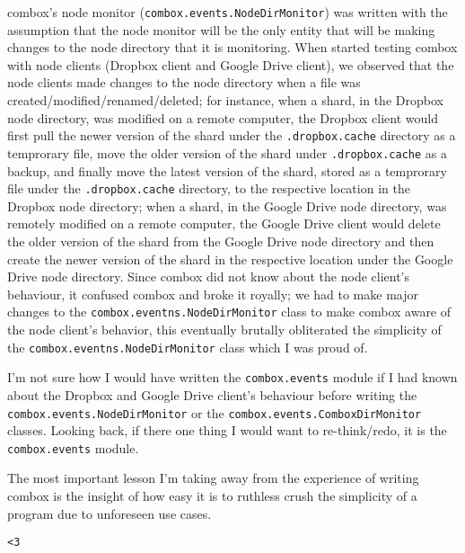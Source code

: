 combox's node monitor (\verb+combox.events.NodeDirMonitor+) was
written with the assumption that the node monitor will be the only
entity that will be making changes to the node directory that it is
monitoring. When started testing combox with node clients (Dropbox
client and Google Drive client), we observed that the node clients
made changes to the node directory when a file was
created/modified/renamed/deleted; for instance, when a shard, in the
Dropbox node directory, was modified on a remote computer, the Dropbox
client would first pull the newer version of the shard under the
\verb+.dropbox.cache+ directory as a temprorary file, move the older
version of the shard under \verb+.dropbox.cache+ as a backup, and
finally move the latest version of the shard, stored as a temprorary
file under the \verb+.dropbox.cache+ directory, to the respective
location in the Dropbox node directory; when a shard, in the Google
Drive node directory, was remotely modified on a remote computer, the
Google Drive client would delete the older version of the shard from
the Google Drive node directory and then create the newer version of
the shard in the respective location under the Google Drive node
directory. Since combox did not know about the node client's
behaviour, it confused combox and broke it royally; we had to make
major changes to the \verb+combox.eventns.NodeDirMonitor+ class to
make combox aware of the node client's behavior, this eventually
brutally obliterated the simplicity of the
\verb+combox.eventns.NodeDirMonitor+ class which I was proud of.

I'm not sure how I would have written the \verb+combox.events+ module
if I had known about the Dropbox and Google Drive client's behaviour
before writing the \verb+combox.events.NodeDirMonitor+ or the
\verb+combox.events.ComboxDirMonitor+ classes. Looking back, if there one
thing I would want to re-think/redo, it is the \verb+combox.events+
module.

The most important lesson I'm taking away from the experience of
writing combox is the insight of how easy it is to ruthless crush the
simplicity of a program due to unforeseen use cases.

\verb+<3+
